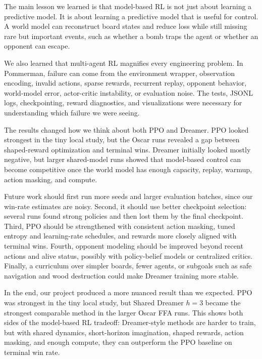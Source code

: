 \documentclass[11pt]{article}
\begin{document}
The main lesson we learned is that model-based RL is not just about learning a predictive model. It is about learning a predictive model that is useful for control. A world model can reconstruct board states and reduce loss while still missing rare but important events, such as whether a bomb traps the agent or whether an opponent can escape.

We also learned that multi-agent RL magnifies every engineering problem. In Pommerman, failure can come from the environment wrapper, observation encoding, invalid actions, sparse rewards, recurrent replay, opponent behavior, world-model error, actor-critic instability, or evaluation noise. The tests, JSONL logs, checkpointing, reward diagnostics, and visualizations were necessary for understanding which failure we were seeing.

The results changed how we think about both PPO and Dreamer. PPO looked strongest in the tiny local study, but the Oscar runs revealed a gap between shaped-reward optimization and terminal wins. Dreamer initially looked mostly negative, but larger shared-model runs showed that model-based control can become competitive once the world model has enough capacity, replay, warmup, action masking, and compute.

Future work should first run more seeds and larger evaluation batches, since our win-rate estimates are noisy. Second, it should use better checkpoint selection: several runs found strong policies and then lost them by the final checkpoint. Third, PPO should be strengthened with consistent action masking, tuned entropy and learning-rate schedules, and rewards more closely aligned with terminal wins. Fourth, opponent modeling should be improved beyond recent actions and alive status, possibly with policy-belief models or centralized critics. Finally, a curriculum over simpler boards, fewer agents, or subgoals such as safe navigation and wood destruction could make Dreamer training more stable.

In the end, our project produced a more nuanced result than we expected. PPO was strongest in the tiny local study, but Shared Dreamer $h=3$ became the strongest comparable method in the larger Oscar FFA runs. This shows both sides of the model-based RL tradeoff: Dreamer-style methods are harder to train, but with shared dynamics, short-horizon imagination, shaped rewards, action masking, and enough compute, they can outperform the PPO baseline on terminal win rate.
\end{document}
